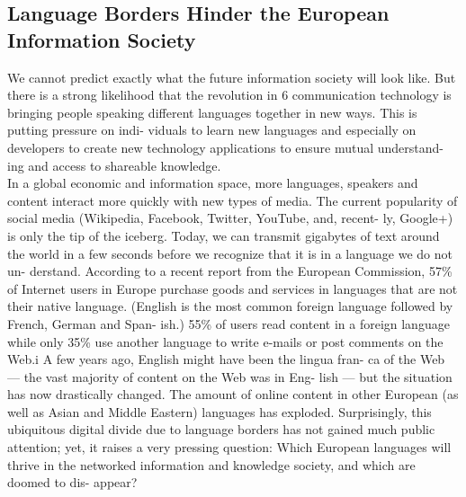 \documentclass[]{../metanetpaper}
\begin{document}
\subsection{Language Borders Hinder the European
Information Society}
We cannot predict exactly what the future information society will
look like. But there is a strong likelihood that the revolution in
6
communication technology is bringing people speaking different
languages together in new ways. This is putting pressure on indi-
viduals to learn new languages and especially on developers to
create new technology applications to ensure mutual understand-
ing and access to shareable knowledge.\\
In a global economic and
information space, more languages, speakers and content interact
more quickly with new types of media. The current popularity of
social media (Wikipedia, Facebook, Twitter, YouTube, and, recent-
ly, Google+) is only the tip of the iceberg. Today, we can transmit gigabytes of text around the world in a few
seconds before we recognize that it is in a language we do not un-
derstand. According to a recent report from the European Commission, 57\% of Internet users in Europe purchase goods and services
in languages that are not their native language. (English is the most
common foreign language followed by French, German and Span-
ish.) 55\% of users read content in a foreign language while only
35\% use another language to write e-mails or post comments on
the Web.i A few years ago, English might have been the lingua fran-
ca of the Web — the vast majority of content on the Web was in Eng-
lish — but the situation has now drastically changed. The amount of
online content in other European (as well as Asian and Middle
Eastern) languages has exploded.
Surprisingly, this ubiquitous digital divide due to language borders
has not gained much public attention; yet, it raises a very pressing
question: Which European languages will thrive in the networked
information and knowledge society, and which are doomed to dis-
appear?
\end{document}
